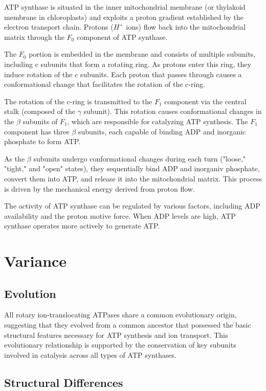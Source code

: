 \documentclass{article}
\begin{document}
ATP synthase is situated in the inner mitochondrial membrane (or thylakoid membrane in chloroplasts) and exploits a proton gradient established by the electron transport chain. Protons ($H^+$ ions) flow back into the mitochondrial matrix through the \textit{$F_0$} component of ATP synthase.

The \textit{$F_0$} portion is embedded in the membrane and consists of multiple subunits, including c subunits that form a rotating ring. As protons enter this ring, they induce rotation of the c subunits. Each proton that passes through causes a conformational change that facilitates the rotation of the c-ring.

The rotation of the c-ring is transmitted to the \textit{$F_1$} component via the central stalk (composed of the $\gamma$ subunit). This rotation causes conformational changes in the $\beta$ subunits of \textit{$F_1$}, which are responsible for catalyzing ATP synthesis. The \textit{$F_1$} component has three $\beta$ subunits, each capable of binding ADP and inorganic phosphate to form ATP.

As the $\beta$ subunits undergo conformational changes during each turn ("loose," "tight," and "open" states), they sequentially bind ADP and inorganiv phosphate, convert them into ATP, and release it into the mitochondrial matrix. This process is driven by the mechanical energy derived from proton flow.

The activity of ATP synthase can be regulated by various factors, including ADP availability and the proton motive force. When ADP levels are high, ATP synthase operates more actively to generate ATP.

\section{Variance}

\subsection{Evolution}

All rotary ion-translocating ATPases share a common evolutionary origin, suggesting that they evolved from a common ancestor that possessed the basic structural features necessary for ATP synthesis and ion transport. This evolutionary relationship is supported by the conservation of key subunits involved in catalysis across all types of ATP synthases.

\subsection{Structural Differences}
\end{document}
